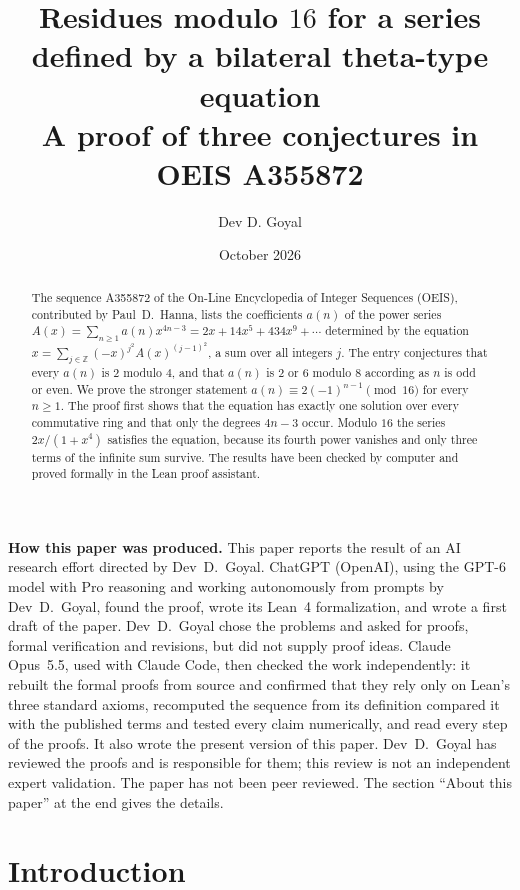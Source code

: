 \documentclass[11pt,a4paper]{article}
\title{Residues modulo $16$ for a series defined by a bilateral theta-type equation\\[6pt]\large A proof of three conjectures in OEIS A355872}
\author{Dev D. Goyal}
\date{October 2026}
\theoremstyle{definition}
\theoremstyle{remark}
\newcommand{\Z}{\mathbb{Z}}
\begin{document}
\maketitle
\begin{abstract}
The sequence A355872 of the On-Line Encyclopedia of Integer Sequences (OEIS), contributed by Paul~D.~Hanna, lists the
coefficients $a(n)$ of the power series $A(x)=\sum_{n\ge1}a(n)x^{4n-3}=2x+14x^5+434x^9+\cdots$ determined by the
equation $x=\sum_{j\in\Z}(-x)^{j^2}A(x)^{(j-1)^2}$, a sum over all integers $j$. The entry conjectures that every $a(n)$ is
$2$ modulo $4$, and that $a(n)$ is $2$ or $6$ modulo $8$ according as $n$ is odd or even. We prove the stronger statement
$a(n)\equiv2(-1)^{n-1}\pmod{16}$ for every $n\ge1$. The proof first shows that the equation has exactly one solution over
every commutative ring and that only the degrees $4n-3$ occur. Modulo $16$ the series $2x/(1+x^4)$ satisfies the
equation, because its fourth power vanishes and only three terms of the infinite sum survive. The results have been
checked by computer and proved formally in the Lean proof assistant.
\end{abstract}
\begin{center}\begin{minipage}{0.88\linewidth}\small
\textbf{How this paper was produced.} This paper reports the result of an AI research effort directed by
Dev~D.~Goyal. ChatGPT (OpenAI), using the GPT-6 model with Pro reasoning and working autonomously from prompts by
Dev~D.~Goyal, found the proof, wrote its Lean~4 formalization, and wrote a first draft of the paper.
Dev~D.~Goyal chose the problems and asked for proofs, formal verification and revisions, but did not supply proof
ideas. Claude Opus~5.5, used with Claude Code, then checked the work independently: it rebuilt the formal proofs from
source and confirmed that they rely only on Lean's three standard axioms, recomputed the sequence from its definition
compared it with the published terms and tested every claim numerically, and read every step of the proofs. It also wrote the present
version of this paper.
Dev~D.~Goyal has reviewed the proofs and is responsible for them; this review is not an independent expert validation.
The paper has not been peer reviewed.
The section ``About this paper'' at the end gives the details.
\end{minipage}\end{center}

\section{Introduction}
\end{document}

